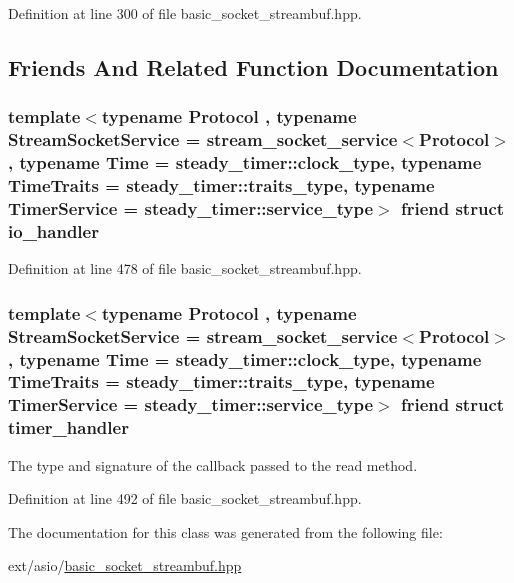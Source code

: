 Definition at line 300 of file basic\+\_\+socket\+\_\+streambuf.\+hpp.



\subsection{Friends And Related Function Documentation}
\hypertarget{classasio_1_1basic__socket__streambuf_a4fdedeb697c55e609e40a2a45ac6d5d2}{}
\subsubsection[{io\+\_\+handler}]{\setlength{\rightskip}{0pt plus 5cm}template$<$typename Protocol , typename Stream\+Socket\+Service  = stream\+\_\+socket\+\_\+service$<$\+Protocol$>$, typename Time  = steady\+\_\+timer\+::clock\+\_\+type, typename Time\+Traits  = steady\+\_\+timer\+::traits\+\_\+type, typename Timer\+Service  = steady\+\_\+timer\+::service\+\_\+type$>$ friend struct io\+\_\+handler\hspace{0.3cm}{\ttfamily [friend]}}\label{classasio_1_1basic__socket__streambuf_a4fdedeb697c55e609e40a2a45ac6d5d2}


Definition at line 478 of file basic\+\_\+socket\+\_\+streambuf.\+hpp.

\hypertarget{classasio_1_1basic__socket__streambuf_aa9ecc4ed02f4f2038c1d97ab84a62aa1}{}
\subsubsection[{timer\+\_\+handler}]{\setlength{\rightskip}{0pt plus 5cm}template$<$typename Protocol , typename Stream\+Socket\+Service  = stream\+\_\+socket\+\_\+service$<$\+Protocol$>$, typename Time  = steady\+\_\+timer\+::clock\+\_\+type, typename Time\+Traits  = steady\+\_\+timer\+::traits\+\_\+type, typename Timer\+Service  = steady\+\_\+timer\+::service\+\_\+type$>$ friend struct timer\+\_\+handler\hspace{0.3cm}{\ttfamily [friend]}}\label{classasio_1_1basic__socket__streambuf_aa9ecc4ed02f4f2038c1d97ab84a62aa1}


The type and signature of the callback passed to the read method. 



Definition at line 492 of file basic\+\_\+socket\+\_\+streambuf.\+hpp.



The documentation for this class was generated from the following file\+:\begin{DoxyCompactItemize}
\item 
ext/asio/\hyperlink{basic__socket__streambuf_8hpp}{basic\+\_\+socket\+\_\+streambuf.\+hpp}\end{DoxyCompactItemize}
